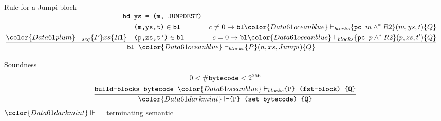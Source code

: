 \documentclass{beamer}
\begin{document}
\begin{frame}{Rule for a Jumpi block}
	\footnotesize
	\hspace*{-20pt}
	$\tfrac{
		\begin{aligned}
		\texttt{hd }&\texttt{ys = (m, JUMPDEST)}&\\
		& \texttt{(m,ys,t)}\in \texttt{bl}
		&c \neq 0 \rightarrow \texttt{bl}{\color{Data61 ocean blue}\vdash_{blocks}} \{\texttt{pc } m \wedge^* R2\} (m,ys,t) \{Q\}
		\\
		{\color{Data61 plum}\vdash_{seq}} \{P\} xs \{R1\} \quad
		&\texttt{(p,zs,t')}\in \texttt{bl}
		&c=0 \rightarrow\texttt{bl}{\color{Data61 ocean blue}\vdash_{blocks}} \{\texttt{pc } p \wedge^* R2\} (p,zs,t') \{Q\}
		\end{aligned}
		}
	{\begin{aligned}\texttt{bl~}{\color{Data61 ocean blue}\vdash_{blocks}} \{P\} (n,xs,Jumpi) \{Q\}\end{aligned}}$
	\
\end{frame}

\begin{frame}{Soundness}
	\[\frac{
		\begin{gathered}
			0< \# \texttt{bytecode} < 2^{256} \\
			\texttt{build-blocks bytecode }{\color{Data61 ocean blue}\vdash_{blocks}} \texttt{\{P\} (fst-block) \{Q\}}
		\end{gathered}}
	{{\color{Data61 dark mint}\Vdash} \texttt{\{P\} (set bytecode) \{Q\}}}
	\]
	${\color{Data61 dark mint}\Vdash}$ = terminating semantic
\end{frame}
\end{document}
